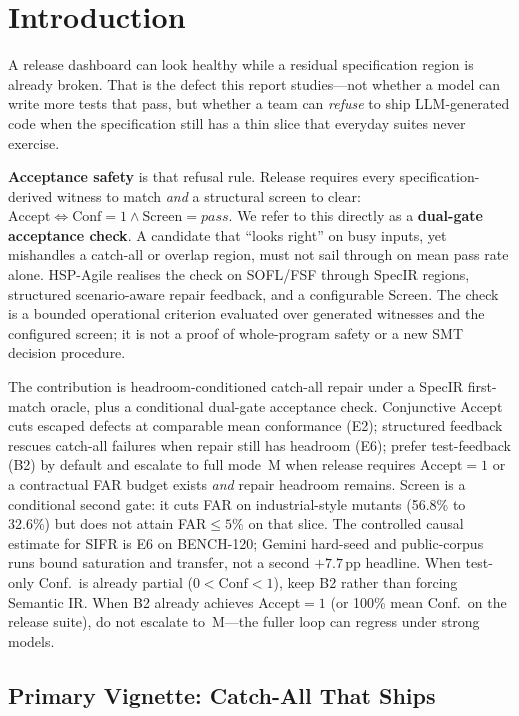 \chapter{Introduction}
\label{ch:intro}

A release dashboard can look healthy while a residual specification region is
already broken.
That is the defect this report studies---not whether a model can write more
tests that pass, but whether a team can \emph{refuse} to ship LLM-generated
code when the specification still has a thin slice that everyday suites never
exercise.

\textbf{Acceptance safety} is that refusal rule.
Release requires every specification-derived witness to match \emph{and} a
structural screen to clear:
$\mathrm{Accept}\Leftrightarrow\mathrm{Conf}{=}1\wedge\mathrm{Screen}{=}\mathit{pass}$.
We refer to this directly as a \textbf{dual-gate acceptance check}.
A candidate that ``looks right'' on busy inputs, yet mishandles a catch-all or
overlap region, must not sail through on mean pass rate alone.
HSP-Agile realises the check on SOFL/FSF through SpecIR regions,
structured scenario-aware repair feedback, and a configurable
$\mathrm{Screen}$.
The check is a bounded operational criterion evaluated over generated witnesses
and the configured screen; it is not a proof of whole-program safety or a new
SMT decision procedure.

The contribution is headroom-conditioned catch-all repair under a SpecIR
first-match oracle, plus a conditional dual-gate acceptance check.
Conjunctive Accept cuts escaped defects at comparable mean conformance (E2);
structured feedback rescues catch-all failures when repair still has headroom
(E6); prefer test-feedback (B2) by default and escalate to full mode~M when
release requires $\mathrm{Accept}{=}1$ or a contractual FAR budget exists
\emph{and} repair headroom remains.
Screen is a conditional second gate: it cuts FAR on industrial-style mutants
(56.8\% to 32.6\%) but does not attain FAR${\le}5\%$ on that slice.
The controlled causal estimate for SIFR is E6 on BENCH-120; Gemini hard-seed
and public-corpus runs bound saturation and transfer, not a second
${+}7.7$\,pp headline.
When test-only Conf.\ is already partial ($0{<}\mathrm{Conf}{<}1$), keep B2
rather than forcing Semantic IR.
When B2 already achieves Accept${=}1$ (or 100\% mean Conf.\ on the release
suite), do not escalate to~M---the fuller loop can regress under strong models.


\section{Primary Vignette: Catch-All That Ships}
\label{sec:intro:running-example}


